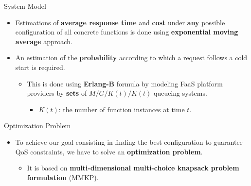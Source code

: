 \documentclass[13.5pt]{beamer}
\newcommand{\B}[1]{\textcolor{TorVergataColor}{\textbf{#1}}}
\begin{document}
\begin{frame}{System Model}

\vspace{\baselineskip}
\begin{itemize}
	\item Estimations of \B{average response time} and \B{cost} under \B{any} possible configuration of all concrete functions is done using \B{exponential moving average} approach.

	\vspace{\baselineskip}
	\item An estimation of the \B{probability} according to which a request follows a cold start is required.
	\begin{itemize}
		\vspace{\baselineskip}
		\item This is done using \B{Erlang-B} formula by modeling FaaS platform providers by \B{sets} of $M/G/K(t)/K(t)$ queueing systems.
		\begin{itemize}
			\item $K(t)$: the number of function instances at time $t$.
		\end{itemize}
	\end{itemize}
\end{itemize}

\end{frame} 
\begin{frame}{Optimization Problem}

\begin{itemize}
	\item To achieve our goal consisting in finding the best configuration to guarantee QoS constraints, we have to solve an \B{optimization problem}.
	\begin{itemize}
		\item It is based on \B{multi-dimensional multi-choice knapsack problem formulation} (MMKP).
	\end{itemize}
\end{itemize}

\end{frame}

\end{document}
